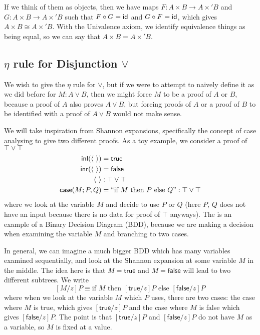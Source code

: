\documentclass[12pt]{article}
\begin{document}
If we think of them as objects, then we have maps $F:A\times B\to A\times'B$ and $G:A\times B\to A\times'B$ such that $F\circ G= \textsf{id}$ and $G\circ F=\textsf{id}$, which gives $A\times B\cong A\times' B$. With the Univalence axiom, we identify equivalence things as being equal, so we can say that $A\times B=A\times' B$.

\subsection{$\eta$ rule for Disjunction $\vee$}

We wish to give the $\eta$ rule for $\vee$, but if we were to attempt to naively define it as we did before for $M:A\vee B$, then we might force $M$ to be a proof of $A$ or $B$, because a proof of $A$ also proves $A\vee B$, but forcing proofs of $A$ or a proof of $B$ to be identified with a proof of $A\vee B$  would not make sense.

We will take inspiration from Shannon expansions, specifically the concept of case analysing to give two different proofs. As a toy example, we consider a proof of $\top\vee\top$
\begin{align*}
{\mathsf{inl}}(\langle\ \rangle)&=\mathsf{true}	\\
{\mathsf{inr}}(\langle\ \rangle)&=\mathsf{false}	\\
\langle\ \rangle&:\top\vee \top	\\
\operatorname{\textsf{case}}(M;P,Q)&= ``\text{if $M$ then $P$ else $Q$}": \top\vee\top
\end{align*}
where we look at the variable $M$ and decide to use $P$ or $Q$ (here $P$, $Q$ does not have an input because there is no data for proof of $\top$ anyways). The is an example of a Binary Decision Diagram (BDD), because we are making a decision when examining the variable $M$ and branching to two cases.

In general, we can imagine a much bigger BDD which has many variables examined sequentially, and look at the Shannon expansion at some variable $M$ in the middle. The idea here is that $M=\textsf{true}$ and $M=\textsf{false}$ will lead to two different subtrees. We write
\[
[M/z]P\equiv \text{if $M$ then $[\mathsf{true}/z]P$ else $[\mathsf{false}/z]P$}
\]
where when we look at the variable $M$ which $P$ uses, there are two cases: the case where $M$ is true, which gives $[\mathsf{true}/z]P$ and the case where $M$ is false which gives $[\mathsf{false}/z]P$. The point is that $[\mathsf{true}/z]P$ and  $[\mathsf{false}/z]P$ do not have $M$ as a variable, so $M$ is fixed at a value.
\end{document}
